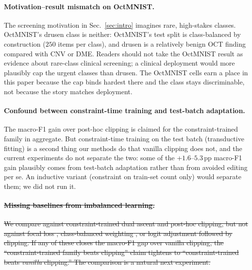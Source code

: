 \documentclass[10pt]{article}
\newcommand{\del}[1]{{\color{red}\sout{#1}}}
\begin{document}
\paragraph{Motivation--result mismatch on OctMNIST.}
The screening motivation in Sec.~\ref{sec:intro} imagines rare, high-stakes
classes. OctMNIST's drusen class is neither: OctMNIST's test split is
class-balanced by construction ($250$ items per class), and drusen is a
relatively benign OCT finding compared with CNV or DME. Readers should
not take the OctMNIST result as evidence about rare-class clinical
screening; a clinical deployment would more plausibly cap the urgent
classes than drusen. The OctMNIST cells earn a place in this paper
because the cap binds hardest there and the class stays discriminable,
not because the story matches deployment.

\paragraph{Confound between constraint-time training and test-batch
adaptation.} The macro-F1 gain over post-hoc clipping is claimed for the
constraint-trained family in aggregate. But constraint-time training on
the test batch (transductive fitting) is a second thing our methods do
that vanilla clipping does not, and the current experiments do not
separate the two: some of the +$1.6$--$5.3$\,pp macro-F1 gain plausibly
comes from test-batch adaptation rather than from avoided editing per
se. An inductive variant (constraint on train-set count only) would
separate them; we did not run it.

\paragraph{\del{Missing baselines from imbalanced learning.}}\leavevmode
\del{We compare against constraint-trained dual ascent and post-hoc clipping,
but not against focal loss \mbox{\citep{lin2017focal}}, class-balanced weighting
\mbox{\citep{cui2019class}}, or logit adjustment \mbox{\citep{menon2020long}} followed
by clipping. If any of these closes the macro-F1 gap over vanilla
clipping, the ``constraint-trained family beats clipping'' claim
tightens to ``constraint-trained beats \emph{vanilla} clipping.''
The comparison is a natural next experiment.}
\end{document}
